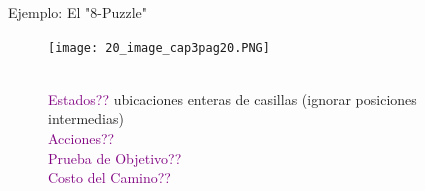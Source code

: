 \documentclass{beamer}
\theoremstyle{definition}
\theoremstyle{theorem}
\theoremstyle{remark}
\begin{document}
\begin{frame}{Ejemplo: El "8-Puzzle"}
\begin{figure}
    \centering
    \texttt{[image: 20\_image\_cap3pag20.PNG]}
    \begin{flushleft}
        \\ \textcolor{purple}{Estados??} ubicaciones enteras de casillas (ignorar posiciones intermedias)
        \\\textcolor{purple}{Acciones??}
        \\\textcolor{purple}{Prueba de Objetivo??}
        \\\textcolor{purple}{Costo del Camino??}
    \end{flushleft}
\end{figure}{}
    
\end{frame}
\end{document}
